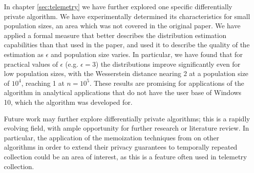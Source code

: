 \documentclass[12pt]{article}
\begin{document}
In chapter \ref{sec:telemetry} we have further explored one specific differentially private algorithm. We have experimentally determined its characteristics for small population sizes, an area which was not covered in the original paper. We have applied a formal measure that better describes the distribution estimation capabilities than that used in the paper, and used it to describe the quality of the estimation as $\epsilon$ and population size varies. In particular, we have found that for practical values of $\epsilon$ (e.g. $\epsilon = 3$) the distributions improve significantly even for low population sizes, with the Wesserstein distance nearing 2 at a population size of $10^4$, reaching 1 at $n=10^5$. These results are promising for applications of the algorithm in analytical applications that do not have the user base of Windows 10, which the algorithm was developed for.

\bigskip

Future work may further explore differentially private algorithms; this is a rapidly evolving field, with ample opportunity for further research or literature review. In particular, the application of the memoization techniques from \cite{microsoft_telemetry} on other algorithms in order to extend their privacy guarantees to temporally repeated collection could be an area of interest, as this is a feature often used in telemetry collection.

\printbibliography
\end{document}
